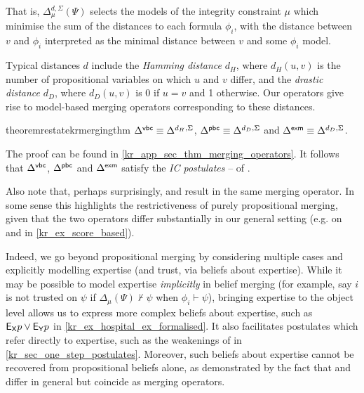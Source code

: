 
That is, $\Delta^{d, \Sigma}_\mu(\Psi)$ selects the models of the integrity
constraint $\mu$ which minimise the sum of the distances to each formula
$\phi_i$, with the distance between $v$ and $\phi_i$ interpreted as the minimal
distance between $v$ and some $\phi_i$ model.

Typical distances $d$ include the \emph{Hamming distance} $d_H$, where $d_H(u,
v)$ is the number of propositional variables on which $u$ and $v$ differ, and
the \emph{drastic distance} $d_D$, where $d_D(u, v)$ is 0 if $u = v$ and 1
otherwise. Our operators give rise to model-based merging operators
corresponding to these distances.

\begin{restatable}{theorem}{restatekrmergingthm}
    \label{kr_thm_merging_operators}
        $\Delta^{\mathsf{vbc}} \equiv \Delta^{d_H, \Sigma}$,
        $\Delta^{\mathsf{pbc}} \equiv \Delta^{d_D, \Sigma}$ and
        $\Delta^{\mathsf{exm}} \equiv \Delta^{d_D, \Sigma}$.
\end{restatable}

The proof can be found in \cref{kr_app_sec_thm_merging_operators}. It follows
that $\Delta^{\mathsf{vbc}}$, $\Delta^{\mathsf{pbc}}$ and $\Delta^{\mathsf{exm}}$ satisfy the
\emph{IC postulates}  --  of
\textcite{konieczny2002merging}.

Also note that, perhaps surprisingly, \partbasedcond{} and \scorebasedop{}
result in the same merging operator. In some sense this highlights the
restrictiveness of purely propositional merging, given that the two operators
differ substantially in our general setting (e.g. on \strongcondsucc{} and in
\cref{kr_ex_score_based}).\footnotemark{}


Indeed, we go beyond propositional merging by considering multiple cases and
explicitly modelling expertise (and trust, via beliefs about expertise). While
it may be possible to model expertise \emph{implicitly} in belief merging (for
example, say $i$ is not trusted on $\psi$ if $\Delta_\mu(\Psi) \not\vdash \psi$
when $\phi_i \vdash \psi$), bringing expertise to the object level allows us to
express more complex beliefs about expertise, such as $\mathsf{E}_{\mathsf{X}}{p} \lor \mathsf{E}_{\mathsf{Y}}{p}$ in
\cref{kr_ex_hospital_ex_formalised}. It also facilitates postulates which refer
directly to expertise, such as the weakenings of  in
\cref{kr_sec_one_step_postulates}. Moreover, such beliefs about expertise
cannot be recovered from propositional beliefs alone, as demonstrated by the
fact that \partbasedcond{} and \scorebasedop{} differ in general but coincide
as merging operators.

